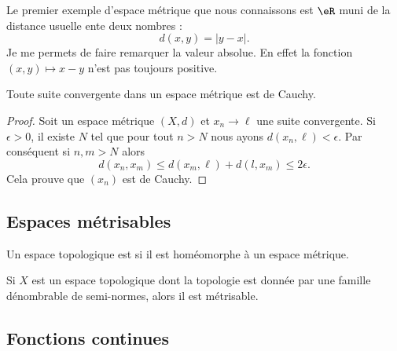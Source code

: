 \begin{example}
Le premier exemple d'espace métrique que nous connaissons est $\eR$ muni de la distance usuelle ente deux nombres :
\begin{equation}
d(x,y)=| y-x |.
\end{equation}
Je me permets de faire remarquer la valeur absolue. En effet la fonction \( (x,y)\mapsto x-y\) n'est pas toujours positive.
\end{example}

\begin{proposition}
    Toute suite convergente dans un espace métrique est de Cauchy.
\end{proposition}

\begin{proof}
    Soit un espace métrique \( (X,d)\) et \( x_n\to\ell\) une suite convergente. Si \( \epsilon>0\), il existe \( N\) tel que pour tout \( n>N\) nous ayons \( d(x_n,\ell)<\epsilon\). Par conséquent si \( n,m>N\) alors
    \begin{equation}
        d(x_n,x_m)\leq d(x_m,\ell)+d(l,x_m)\leq 2\epsilon.
    \end{equation}
    Cela prouve que \( (x_n)\) est de Cauchy.
\end{proof}

\subsection{Espaces métrisables}

\begin{definition}
    Un espace topologique est  si il est homéomorphe à un espace métrique.
\end{definition}

\begin{proposition}
    Si \( X\) est un espace topologique dont la topologie est donnée par une famille dénombrable de semi-normes, alors il est métrisable.
\end{proposition}

\subsection{Fonctions continues}

